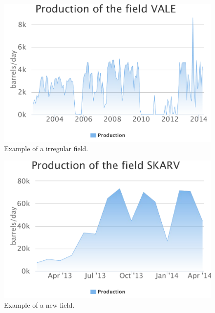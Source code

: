 \documentclass[review]{elsarticle}
\begin{document}
\pagebreak

\noindent 
\begin{figure}[H]
\includegraphics[width=1\columnwidth]{vale}
\caption{Example of a irregular field.}
\label{irregular} 
\end{figure}

\pagebreak

\noindent 
\begin{figure}[H]
\includegraphics[width=1\columnwidth]{skarv}
\caption{Example of a new field.}
\label{new} 
\end{figure}
\end{document}
